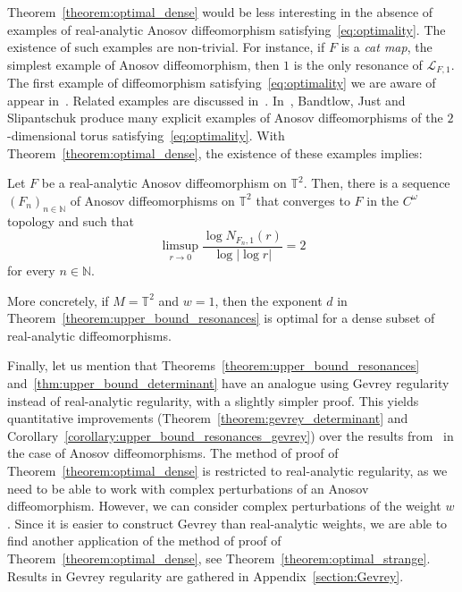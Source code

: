 \documentclass[AHL,Unicode,longabstracts,published]{cedram}
\newcommand{\va}[1]{\left|#1\right|}
\newcommand{\clL}{\mathcal{L}}
\newcommand{\bbT}{\mathbb{T}}
\newcommand{\bbN}{\mathbb{N}}
\begin{document}
Theorem~\ref{theorem:optimal_dense} would be less interesting in the absence of examples of real-analytic Anosov diffeomorphism satisfying~\eqref{eq:optimality}. The existence of such examples are non-trivial. For instance, if $F$ is a \emph{cat map}, the simplest example of Anosov diffeomorphism, then $1$ is the only resonance of $\clL_{F,1}$. The first example of diffeomorphism satisfying~\eqref{eq:optimality} we are aware of appear in~\cite{first_example}. Related examples are discussed in~\cite{other_example}. In~\cite{optimal_examples}, Bandtlow, Just and Slipantschuk produce many explicit examples of Anosov diffeomorphisms of the $2$-dimensional torus satisfying~\eqref{eq:optimality}. With Theorem~\ref{theorem:optimal_dense}, the existence of these examples implies:

\begin{theo}\label{theorem:optimality_torus}
Let $F$ be a real-analytic Anosov diffeomorphism on $\bbT^2$. Then, there is a sequence $(F_n)_{n \in \bbN}$ of Anosov diffeomorphisms on $\bbT^2$ that converges to $F$ in the $C^\omega$ topology and such that
\begin{equation*}
\limsup_{r \to 0} \frac{\log N_{F_n,1}(r)}{\log \va{\log r}} = 2
\end{equation*}
for every $n \in \bbN$.
\end{theo}

More concretely, if $M = \bbT^2$ and $w = 1$, then the exponent $d$ in Theorem~\ref{theorem:upper_bound_resonances} is optimal for a dense subset of real-analytic diffeomorphisms.

Finally, let us mention that Theorems~\ref{theorem:upper_bound_resonances} and~\ref{thm:upper_bound_determinant} have an analogue using Gevrey regularity instead of real-analytic regularity, with a slightly simpler proof. This yields quantitative improvements (Theorem~\ref{theorem:gevrey_determinant} and Corollary~\ref{corollary:upper_bound_resonances_gevrey}) over the results from~\cite[\S 2.2]{local_and_global} in the case of Anosov diffeomorphisms. The method of proof of Theorem~\ref{theorem:optimal_dense} is restricted to real-analytic regularity, as we need to be able to work with complex perturbations of an Anosov diffeomorphism. However, we can consider complex perturbations of the weight $w$. Since it is easier to construct Gevrey than real-analytic weights, we are able to find another application of the method of proof of Theorem~\ref{theorem:optimal_dense}, see Theorem~\ref{theorem:optimal_strange}. Results in Gevrey regularity are gathered in Appendix~\ref{section:Gevrey}.
\end{document}
